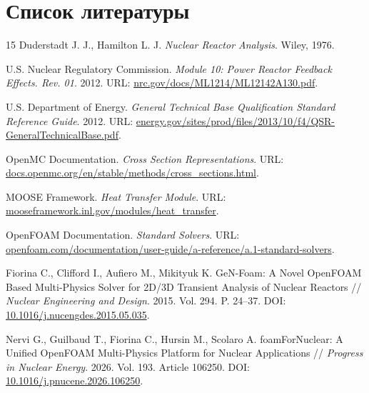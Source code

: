 \documentclass[12pt]{article}
\begin{document}
\section{Список литературы}
\begin{thebibliography}{15}
    Duderstadt J. J., Hamilton L. J. \textit{Nuclear Reactor Analysis}. Wiley, 1976.

    U.S. Nuclear Regulatory Commission. \textit{Module 10: Power Reactor Feedback Effects. Rev. 01}. 2012. URL: \href{https://www.nrc.gov/docs/ML1214/ML12142A130.pdf}{nrc.gov/docs/ML1214/ML12142A130.pdf}.

    U.S. Department of Energy. \textit{General Technical Base Qualification Standard Reference Guide}. 2012. URL: \href{https://www.energy.gov/sites/prod/files/2013/10/f4/QSR-GeneralTechnicalBase.pdf}{energy.gov/sites/prod/files/2013/10/f4/QSR-GeneralTechnicalBase.pdf}.

    OpenMC Documentation. \textit{Cross Section Representations}. URL: \href{https://docs.openmc.org/en/stable/methods/cross_sections.html}{docs.openmc.org/en/stable/methods/cross\_sections.html}.

    MOOSE Framework. \textit{Heat Transfer Module}. URL: \href{https://mooseframework.inl.gov/modules/heat_transfer/}{mooseframework.inl.gov/modules/heat\_transfer}.

    OpenFOAM Documentation. \textit{Standard Solvers}. URL: \href{https://www.openfoam.com/documentation/user-guide/a-reference/a.1-standard-solvers}{openfoam.com/documentation/user-guide/a-reference/a.1-standard-solvers}.

    Fiorina C., Clifford I., Aufiero M., Mikityuk K. GeN-Foam: A Novel OpenFOAM Based Multi-Physics Solver for 2D/3D Transient Analysis of Nuclear Reactors // \textit{Nuclear Engineering and Design}. 2015. Vol. 294. P. 24--37. DOI: \href{https://doi.org/10.1016/j.nucengdes.2015.05.035}{10.1016/j.nucengdes.2015.05.035}.

    Nervi G., Guilbaud T., Fiorina C., Hursin M., Scolaro A. foamForNuclear: A Unified OpenFOAM Multi-Physics Platform for Nuclear Applications // \textit{Progress in Nuclear Energy}. 2026. Vol. 193. Article 106250. DOI: \href{https://doi.org/10.1016/j.pnucene.2026.106250}{10.1016/j.pnucene.2026.106250}.
\end{thebibliography}
\end{document}
